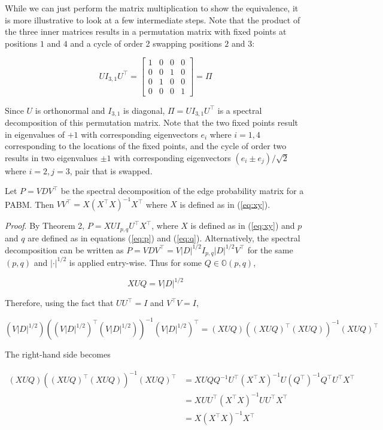 \documentclass[
  12pt,
]{article}
\begin{document}
\begin{remark} 
While we can just perform the matrix multiplication to show the 
equivalence, it is more illustrative to look at a few intermediate steps. Note 
that the product of the three inner matrices results in a permutation matrix 
with fixed points at positions $1$ and $4$ and a cycle of order 2 swapping 
positions $2$ and $3$: 

$$U I_{3, 1} U^\top = \begin{bmatrix} 
  1 & 0 & 0 & 0 \\ 
  0 & 0 & 1 & 0 \\ 
  0 & 1 & 0 & 0 \\ 
  0 & 0 & 0 & 1 
\end{bmatrix} = \Pi$$

Since $U$ is orthonormal and $I_{3, 1}$ is diagonal, $\Pi = U I_{3, 1} U^\top$ 
is a spectral decomposition of this permutation matrix. Note that the two fixed 
points result in eigenvalues of $+1$ with corresponding eigenvectors $e_i$ 
where $i = 1, 4$ corresponding to the locations of the fixed points, and the 
cycle of order two results in two eigenvalues $\pm 1$ with corresponding 
eigenvectors $(e_i \pm e_j) / \sqrt{2}$ where $i = 2, j = 3$, pair that is 
swapped.
\end{remark}

\begin{lemma}
\label{lemma1}
Let $P = V D V^\top$ be the spectral decomposition of the edge probability 
matrix for a PABM. Then $V V^\top = X (X^\top X)^{-1} X^\top$ where $X$ is 
defined as in (\ref{eq:xy}).
\end{lemma}

\emph{Proof}. By Theorem 2, \(P = X U I_{p, q} U^\top X^\top\), where
\(X\) is defined as in (\ref{eq:xy}) and \(p\) and \(q\) are defined as
in equations (\ref{eq:p}) and (\ref{eq:q}). Alternatively, the spectral
decomposition can be written as
\(P = V D V^\top = V |D|^{1/2} I_{p, q} |D|^{1/2} V^\top\) for the same
\((p, q)\) and \(|\cdot|^{1/2}\) is applied entry-wise. Thus for some
\(Q \in \mathbb{O}(p, q)\),

\[X U Q = V |D|^{1/2}\]

Therefore, using the fact that \(U U^\top = I\) and \(V^\top V = I\),

\[(V |D|^{1/2}) ((V |D|^{1/2})^\top (V |D|^{1/2}))^{-1} (V |D|^{1/2})^\top = 
(X U Q) ((X U Q)^\top (X U Q))^{-1} (X U Q)^\top\]

The right-hand side becomes

\[\begin{split}
  (X U Q) ((X U Q)^\top (X U Q))^{-1} (X U Q)^\top & 
    = X U Q Q^{-1} U^\top (X^\top X)^{-1} 
    U (Q^\top)^{-1} Q^\top U^\top X^\top \\
  & = X U U^\top (X^\top X)^{-1} U U^\top X^\top \\
  & = X (X^\top X)^{-1} X^\top
\end{split}\]
\end{document}
